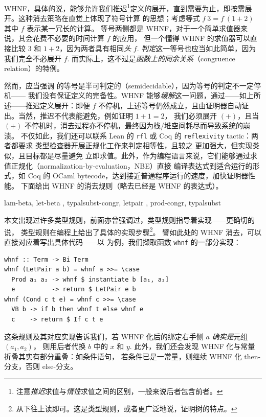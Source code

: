WHNF，具体的说，能够允许我们推迟\footnote{
  注意\emph{推迟}求值与\emph{惰性}求值之间的区别，一般来说后者包含前者。
}定义的展开，直到需要为止，即按需展开。这种消去策略在直觉上体现了符号计算
的思想；考虑等式 $f\ 3 = f\ (1 + 2)$ 其中 $f$ 表示某一冗长的计算。
等号两侧都是 WHNF，对于一个简单求值器来说，其会花费不必要的时间计算 $f$ 的应用，
但一个懂得 WHNF 的求值器可以直接比较 $3$ 和 $1 + 2$，因为两者具有相同\emph{头} $f$.
\emph{判定}这一等号也应当如此简单，因为我们完全不必展开 $f$.
而实际上，这不过是\emph{函数上的同余关系}（congruence relation）的特例。

然而，应当强调 \Tigrisd 的等号是半可判定的（semidecidable），因为等号的判定不一定停机——
我们没有保证定义的完备性。WHNF 能够\emph{缓解}这一问题，通过——如上所述——推迟定义展开：即便 $f$
不停机，上述等号仍然成立，且由证明器自动证出。当然，推迟不代表能避免，例如证明 $1 + 1 = 2$，
我们必须展开 $(+)$，且当 $(+)$ 不停机时，消去过程亦不停机，最终因为栈/堆空间耗尽而导致系统的崩溃。
不仅如此，我们还可以联系 Lean 的 \texttt{rfl} 或 Coq 的 \texttt{reflexivity} tactic：两者都要求
类型检查器开展正规化工作来判定相等性，且较之 \Tigrisd 更加强大，但实现类似，且目标都是尽量避免
立即求值。此外，作为编程语言来说，它们能够通过求值正规化（normalization-by-evaluation，NBE）直接
编译表达式到适合运行的形式，如 Coq 的 OCaml bytecode，达到接近普通程序运行的速度，加快证明器性能。
下面给出 WHNF 的消去规则（略去已经是 WHNF 的表达式）。

{
  lam-beta, let-beta
  , typalsubst-congr, letpair
  , prod-congr, typalsubst
}

本文出现过许多类型规则，前面亦曾强调过，类型规则指导着实现——更确切的说，
类型规则在编程上给出了具体的实现步骤\footnote{从下往上读即可。这是类型规则，或者更广泛地说，证明树的特点。}。
譬如此处的 WHNF 消去，可以直接对应着写出具体代码——以  为例，我们撷取函数 \texttt{whnf} 的一部分实现：
\begin{verbatim}
whnf :: Term -> Bi Term
whnf (LetPair a b) = whnf a >>= \case
  Prod a₁ a₂ -> whnf $ instantiate b [a₁, a₂]
  e          -> return $ LetPair e b
whnf (Cond c t e) = whnf c >>= \case
  VB b -> if b then whnf t else whnf e
  c    -> return $ If c t e
\end{verbatim}
这条规则及其对应实现告诉我们，若 WHNF 化后的绑定右手侧 $a$ \emph{确实是}元组 $(a_1, a_2)$，
则用后者代换 $b$ 中的 $x$ 和 $y$. 此外，我们还会发现 WHNF 化与常量折叠其实有部分重叠：如条件语句，
若条件已是一常量，则继续 WHNF 化 then-分支，否则 else-分支。

